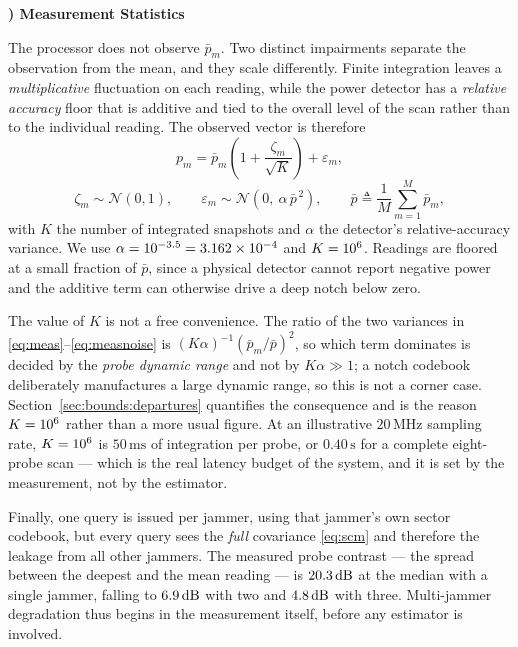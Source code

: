 \documentclass[journal]{IEEEtran}
\newcommand{\dB}{\,\mathrm{dB}}
\newcounter{modelpart}[subsection]
\newcommand{\modelpart}[1]{%
  \par\medskip\refstepcounter{modelpart}%
  \noindent\textbf{\arabic{modelpart}) #1}\par\smallskip\noindent\ignorespaces}
\begin{document}
\modelpart{Measurement Statistics}
\label{sec:model:stats}

The processor does not observe $\bar{p}_m$. Two distinct impairments separate
the observation from the mean, and they scale differently. Finite integration
leaves a \emph{multiplicative} fluctuation on each reading, while the power
detector has a \emph{relative accuracy} floor that is additive and tied to the
overall level of the scan rather than to the individual reading. The observed
vector is therefore
\begin{equation}
p_m = \bar{p}_m\left(1 + \frac{\zeta_m}{\sqrt{K}}\right) + \varepsilon_m ,
\label{eq:meas}
\end{equation}
\begin{equation}
\zeta_m \sim \mathcal{N}(0,1),
\qquad
\varepsilon_m \sim \mathcal{N}\!\left(0,\ \alpha\, \bar{p}^{\,2}\right),
\qquad
\bar{p} \triangleq \frac{1}{M}\sum_{m=1}^{M}\bar{p}_m ,
\label{eq:measnoise}
\end{equation}
with $K$ the number of integrated snapshots and $\alpha$ the detector's
relative-accuracy variance. We use $\alpha = 10^{-3.5} = 3.162\times10^{-4}$
and $K = 10^{6}$. Readings are floored at a small fraction of $\bar{p}$, since
a physical detector cannot report negative power and the additive term can
otherwise drive a deep notch below zero.

The value of $K$ is not a free convenience. The ratio of the two variances in
\eqref{eq:meas}--\eqref{eq:measnoise} is $(K\alpha)^{-1}(\bar{p}_m/\bar{p})^2$,
so which term dominates is decided by the \emph{probe dynamic range} and not by
$K\alpha \gg 1$; a notch codebook deliberately manufactures a large dynamic
range, so this is not a corner case. Section~\ref{sec:bounds:departures}
quantifies the consequence and is the reason $K = 10^{6}$ rather than a more
usual figure. At an illustrative $20\,\mathrm{MHz}$ sampling rate,
$K = 10^{6}$ is $50\,\mathrm{ms}$ of integration per probe, or
$0.40\,\mathrm{s}$ for a complete eight-probe scan --- which is the real
latency budget of the system, and it is set by the measurement, not by the
estimator.

Finally, one query is issued per jammer, using that jammer's own sector
codebook, but every query sees the \emph{full} covariance \eqref{eq:scm} and
therefore the leakage from all other jammers. The measured probe contrast ---
the spread between the deepest and the mean reading --- is $\contrastOneJ\dB$ at the
median with a single jammer, falling to $\contrastTwoJ\dB$ with two and $\contrastThreeJ\dB$ with
three. Multi-jammer degradation thus begins in the measurement itself, before
any estimator is involved.
\end{document}
